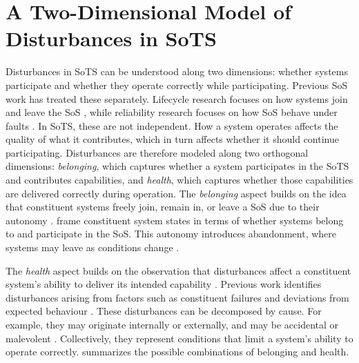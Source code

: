 \section{A Two-Dimensional Model of Disturbances in SoTS}
\label{sec:two-dimensional-disturbances}
Disturbances in SoTS can be understood along two dimensions: whether systems participate and whether they operate correctly while participating. Previous SoS work has treated these separately. Lifecycle research focuses on how systems join and leave the SoS \cite{axelsson2019refined,svenson2020situation,hristozov2023modeling}, while reliability research focuses on how SoS behave under faults \cite{ferreira2021reliability, uday2015designing,garro2014reliability,li2025reliability}. In SoTS, these are not independent. How a system operates affects the quality of what it contributes, which in turn affects whether it should continue participating. Disturbances are therefore modeled along two orthogonal dimensions: \emph{belonging}, which captures whether a system participates in the SoTS and contributes capabilities, and \emph{health}, which captures whether those capabilities are delivered correctly during operation.
The \emph{belonging} aspect builds on the idea that constituent systems freely join, remain in, or leave a SoS due to their autonomy \cite{salado2015abandonment}. \citet{axelsson2019refined} frame constituent system states in terms of whether systems belong to and participate in the SoS. This autonomy introduces abandonment, where systems may leave as conditions change \cite{salado2016exile,baldwin2011formation}.



The \emph{health} aspect builds on the observation that disturbances affect a constituent system's ability to deliver its intended capability \cite{ferreira2023towards}. Previous work identifies disturbances arising from factors such as constituent failures and deviations from expected behaviour \cite{ferreira2021reliability, ferreira2024framework}. These disturbances can be decomposed by cause. For example, they may originate internally or externally, and may be accidental or malevolent \cite{ferreira2023towards}. Collectively, they represent conditions that limit a system's ability to operate correctly.
 summarizes the possible combinations of belonging and health.

